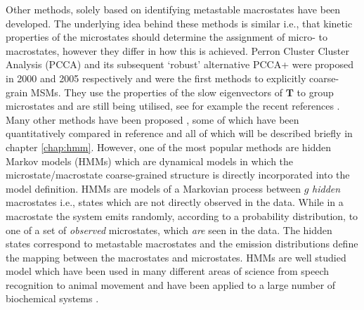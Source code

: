 Other methods, solely based on identifying metastable macrostates have been developed.  The underlying idea behind these methods is similar i.e., that kinetic properties of the microstates should determine the assignment of micro- to macrostates, however they differ in how this is achieved. Perron Cluster Cluster Analysis (PCCA)  \cite{deuflhardIdentificationAlmostInvariant2000a} and its subsequent `robust' alternative PCCA+ \cite{deuflhardRobustPerronCluster2005b} were proposed in 2000 and 2005 respectively and were the first methods to explicitly coarse-grain MSMs. They use the properties of the slow eigenvectors of $\mathbf{T}$ to group microstates and are still being utilised, see for example the recent references \cite{LoopMotionTriosephosphate, plattnerProteinConformationalPlasticity2015, islamExploringDynamicsPropeller2017}. Many other methods have been proposed \cite{yaoHierarchicalNystromMethods2013a, bowmanImprovedCoarsegrainingMarkov2012a, jainIdentifyingMetastableStates2012a, orioliDimensionalReductionMarkov2016c, husicMinimumVarianceClustering2018, wuProjectedMetastableMarkov2015}, some of which have been quantitatively compared in reference \cite{bowmanQuantitativeComparisonAlternative2013} and all of which will be described briefly in chapter \ref{chap:hmm}.  However, one of the most popular methods are hidden Markov models (HMMs) \cite{noeProjectedHiddenMarkov2013a} which are dynamical models in which the microstate/macrostate coarse-grained structure is directly incorporated into the model definition. HMMs are models of a Markovian process between $g$ \emph{hidden} macrostates i.e., states which are not directly observed in the data. While in a macrostate the system emits randomly, according to a probability distribution, to one of a set of \emph{observed} microstates, which \emph{are} seen in the data. The hidden states correspond to metastable macrostates and the emission distributions  define the mapping between the macrostates and microstates. HMMs are well studied model  \cite{welch2003hidden, rabinerTutorialHiddenMarkov1989} which have been used in many different areas of science from speech recognition \cite{rabinerTutorialHiddenMarkov1989} to animal movement \cite{pohleSelectingNumberStates2017} and have been applied to a large number of biochemical systems \cite{mondalAtomicResolutionMechanism2018a, plattnerCompleteProteinProtein2017, panConformationalHeterogeneityMichaelis2016, juarez-jimenezDynamicDesignManipulation2020, wangDynamicalBehaviorVLactamases2019,FastFoldingPathwaysThrombinBinding2018,remingtonFluorescenceQuenching2aminopurinelabeled2019,curado-carballadaHiddenConformationsAspergillus2019,furiniIontriggeredSelectivityBacterial2018,yangMappingPathwayDynamics2018,ahalawatMappingSubstrateRecognition2018,olaposiMembraneBoundTranscriptionFactor2019, xiaoNaBindingModes2019, hansonWhatMakesKinase2019}.

